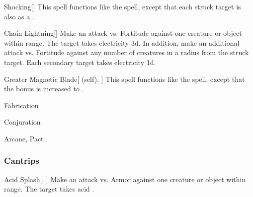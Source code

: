 \lowercase{\hypertarget{spell:Shocking}{}}\label{spell:Shocking}
\begin{apability}[\nth{3}]{\hypertarget{spell:Shocking}{Shocking}}[]
This spell functions like the  spell, except that each struck target is also  as a .
\end{apability}
\vspace{0.25em}



\lowercase{\hypertarget{spell:Chain Lightning}{}}\label{spell:Chain Lightning}
\begin{apability}[\nth{4}]{\hypertarget{spell:Chain Lightning}{Chain Lightning}}[]
Make an attack vs. Fortitude against one creature or object within \rngmed range.
\hit The target takes electricity  \plus3d.
In addition, make an additional attack vs. Fortitude against any number of creatures in a \areamed radius from the struck target.
\hit Each secondary target takes electricity  \plus1d.
\end{apability}
\vspace{0.25em}



\lowercase{\hypertarget{spell:Greater Magnetic Blade}{}}\label{spell:Greater Magnetic Blade}
\begin{attuneability}[\nth{6}]{\hypertarget{spell:Greater Magnetic Blade}{Greater Magnetic Blade}}[ (self), ]
This spell functions like the  spell, except that the bonus is increased to .
\end{attuneability}
\vspace{0.25em}


\newpage
\begin{spellsection}{Fabrication}

\begin{spellheader}
\end{spellheader}


 Conjuration

 Arcane, Pact

\subsubsection{Cantrips}


\begin{freeability}{Acid Splash}[, ]
Make an attack vs. Armor against one creature or object within \rngmed range.
\hit The target takes acid .
\end{freeability}

\end{spellsection}


